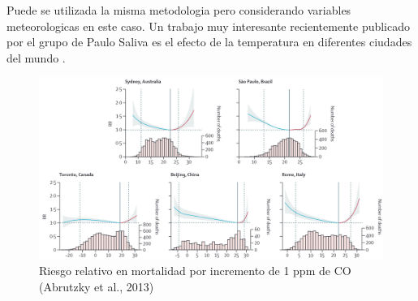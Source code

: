\documentclass[]{book}
\begin{document}
Puede se utilizada la misma metodologia pero considerando variables meteorologicas en este caso. Un trabajo muy interesante recientemente publicado por el grupo de Paulo Saliva es el efecto de la temperatura en diferentes ciudades del mundo \citep{GASPARRINI2015369}.

\begin{figure}
\includegraphics[width=18.97in,height=1.8\textheight]{figs/temp1} \caption{Riesgo relativo en mortalidad por incremento de 1 ppm de CO (Abrutzky et al., 2013)}\label{fig:unnamed-chunk-58}
\end{figure}


\end{document}
